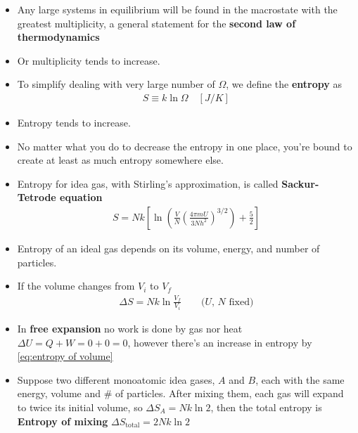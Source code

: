\documentclass{book}
\begin{document}
\begin{itemize}
	\item Any large systems in equilibrium will be found in the macrostate with the greatest multiplicity,
				a general statement for the \textbf{second law of thermodynamics}
  \item Or multiplicity tends to increase.
  \item To simplify dealing with very large number of $\Omega$, we define the \textbf{entropy} as
				\begin{align}
					\label{eq:entropy}
					S \equiv k \ln{\Omega} \quad [\unit{J/K}]
				\end{align}
  \item Entropy tends to increase.
  \item No matter what you do to decrease the entropy in one place, you're bound to create at least
				as much entropy somewhere else.
	\item Entropy for idea gas, with Stirling's approximation, is called
				\textbf{Sackur-Tetrode equation}
				\begin{align}
					S = Nk \left[
						\ln{ \left( \frac{V}{N} \left( \frac{4\pi m U}{3Nh^2} \right)^{3/2} \right) + \frac{5}{2}}
					\right]
				\end{align}
	\item Entropy of an ideal gas depends on its volume, energy, and number of particles.
  \item If the volume changes from $V_i$ to $V_f$
				\begin{align}
					\label{eq:entropy of volume}
					\Delta{S} = Nk \ln{\frac{V_f}{V_i}} \qquad \text{($U$, $N$ fixed)}
				\end{align}
  \item In \textbf{free expansion} no work is done by gas nor heat
				$\Delta{U} = Q + W = 0 + 0 =0$, however there's an increase in entropy by
				\eqref{eq:entropy of volume}
  \item  Suppose two different monoatomic idea gases, $A$ and $B$,
				each with the same energy, volume and # of particles. After mixing them, each gas will expand
				to twice its initial volume, so $\Delta{S_A} = Nk \ln{2}$, then the total entropy is
				\textbf{Entropy of mixing} $\Delta{S_{\text{total}} = 2Nk \ln{2}}$


\end{itemize}
\end{document}
